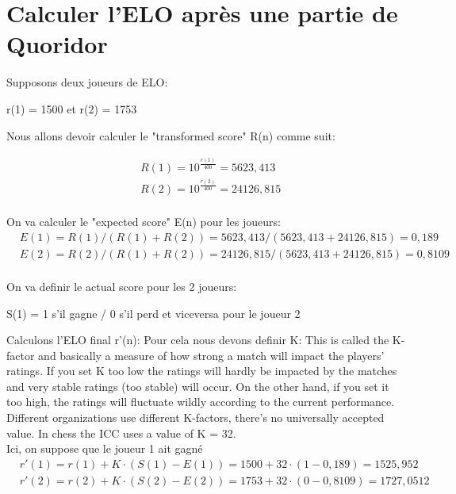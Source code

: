 \documentclass[11pt]{article}
\theoremstyle{definition}
\begin{document}
\section{Calculer l'ELO après une partie de Quoridor}
    Supposons deux joueurs de ELO: 
    \begin{center}
        r(1) = 1500 et r(2) = 1753
    \end{center}
    Nous allons devoir calculer le "transformed score" R(n) comme suit:
        
    \begin{equation}
        \begin{split}
            & R(1) = 10^{\frac{r(1)}{400}} = 5623,413 \\
            & R(2) = 10^{\frac{r(2)}{400}} = 24126,815 \\
        \end{split}
    \end{equation}

    On va calculer le "expected score" E(n) pour les joueurs:
    \begin{equation}
        \begin{split}
            & E(1) = R(1) / ( R(1) + R(2)) = 5623,413 / (5623,413 + 24126,815) = 0,189 \\
            & E(2) = R(2) / ( R(1) + R(2)) = 24126,815 / (5623,413 + 24126,815) = 0,8109 \\
        \end{split}
    \end{equation}

    On va definir le actual score pour les 2 joueurs:
    \begin{center}
        S(1) = 1 s'il gagne / 0 s'il perd et viceversa pour le joueur 2
    \end{center}
    
    Calculons l'ELO final r'(n):
    Pour cela nous devons definir K:
    This is called the K-factor and basically a measure of how strong a match will impact the players’ ratings.
    If you set K too low the ratings will hardly be impacted by the matches and very stable ratings (too stable) will occur.
    On the other hand, if you set it too high, the ratings will fluctuate wildly according to the current performance.
     Different organizations use different K-factors, there’s no universally accepted value. In chess the ICC uses a value of K = 32. \\
    Ici, on suppose que le joueur 1 ait gagné
    \begin{equation}
        \begin{split}
           & r'(1) = r(1) + K \cdot (S(1) - E(1)) = 1500 + 32 \cdot (1 - 0,189) = 1525,952 \\
           & r'(2) = r(2) + K \cdot (S(2) - E(2)) = 1753 + 32 \cdot (0-0,8109) = 1727,0512 \\
        \end{split}
    \end{equation}
\end{document}
